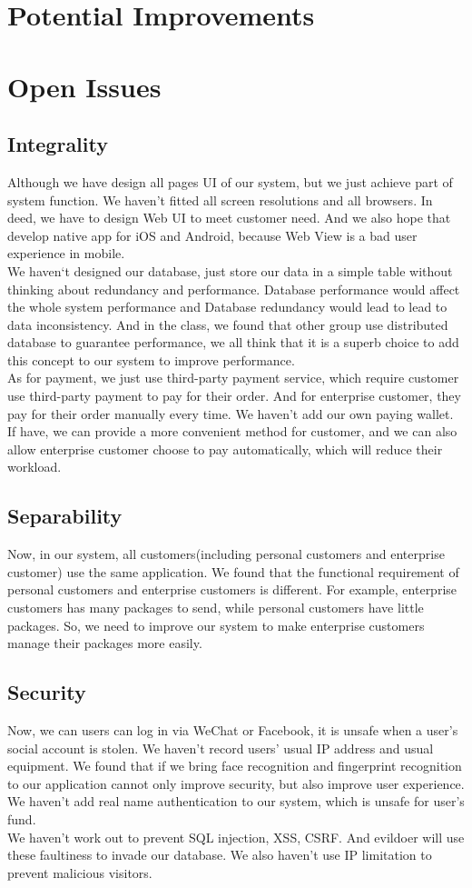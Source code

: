\documentclass[12pt]{scrreprt}
\begin{document}
\chapter{Potential Improvements}


\chapter{Open Issues}
\section{Integrality}
Although we have design all pages UI of our system, but we just achieve part of system function. We haven't fitted all screen resolutions and all browsers. In deed, we have to design Web UI to meet customer need. And we also hope that develop native app for iOS and Android, because Web View is a bad user experience in mobile.\\
We haven‘t designed our database, just store our data in a simple table without thinking about redundancy and performance. Database performance would affect the whole system performance and Database redundancy would lead to lead to data inconsistency. And in the class, we found that other group use distributed database to guarantee performance, we all think that it is a superb choice to add this concept to our system to improve performance.\\
As for payment, we just use third-party payment service, which require customer use third-party payment to pay for their order. And for enterprise customer, they pay for their order manually every time. We haven't add our own paying wallet. If have, we can provide a more convenient method for customer, and we can also allow enterprise customer choose to pay automatically, which will reduce their workload.
\section{Separability}
Now, in our system, all customers(including personal customers and enterprise customer) use the same application. We found that the functional requirement of personal customers and enterprise customers is different. For example, enterprise customers has many packages to send, while personal customers have little packages. So, we need to improve our system to make enterprise customers manage their packages more easily.
\section{Security}
Now, we can users can log in via WeChat or Facebook, it is unsafe when a user's social account is stolen. We haven't record users' usual IP address and usual equipment. We found that if we bring face recognition and fingerprint recognition to our application cannot only improve security, but also improve user experience. We haven't add real name authentication to our system, which is unsafe for user's fund.\\
We haven't work out to prevent SQL injection, XSS, CSRF. And evildoer will use these faultiness to invade our database. We also haven't use IP limitation to prevent malicious visitors.
\end{document}
